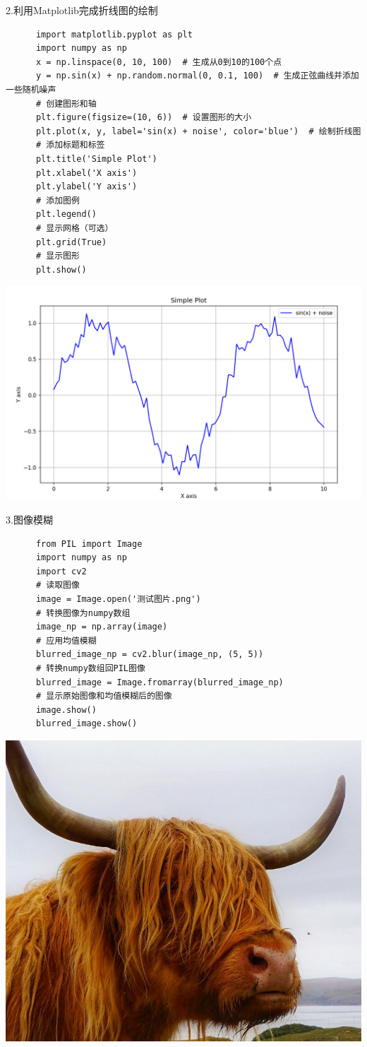\documentclass{article}
\begin{document}
2.利用Matplotlib完成折线图的绘制
    \begin{verbatim}
      import matplotlib.pyplot as plt
      import numpy as np
      x = np.linspace(0, 10, 100)  # 生成从0到10的100个点
      y = np.sin(x) + np.random.normal(0, 0.1, 100)  # 生成正弦曲线并添加一些随机噪声
      # 创建图形和轴
      plt.figure(figsize=(10, 6))  # 设置图形的大小
      plt.plot(x, y, label='sin(x) + noise', color='blue')  # 绘制折线图
      # 添加标题和标签
      plt.title('Simple Plot')
      plt.xlabel('X axis')
      plt.ylabel('Y axis')
      # 添加图例
      plt.legend()
      # 显示网格（可选）
      plt.grid(True)
      # 显示图形
      plt.show()
   \end{verbatim}


\noindent
\begin{minipage}{\linewidth}
 \centering
  \includegraphics[width=0.5\linewidth]{折线图.png}
  \label{fig:example}
\end{minipage}

3.图像模糊
   \begin{verbatim}
      from PIL import Image
      import numpy as np
      import cv2
      # 读取图像
      image = Image.open('测试图片.png')
      # 转换图像为numpy数组
      image_np = np.array(image)
      # 应用均值模糊
      blurred_image_np = cv2.blur(image_np, (5, 5))
      # 转换numpy数组回PIL图像
      blurred_image = Image.fromarray(blurred_image_np)
      # 显示原始图像和均值模糊后的图像
      image.show()
      blurred_image.show()
  \end{verbatim}

\noindent
\begin{minipage}{\linewidth}
 \centering
  \includegraphics[width=0.5\linewidth]{测试图片.png}
  \label{fig:example}
\end{minipage}
\end{document}
